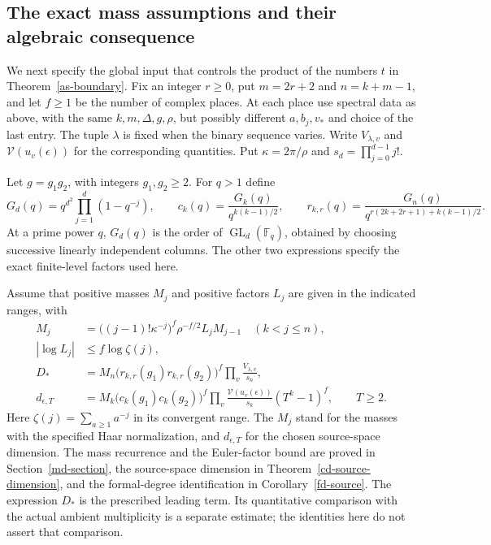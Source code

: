 \subsection{The exact mass assumptions and their algebraic consequence}

We next specify the global input that controls the product of the
numbers $t$ in Theorem~\ref{as-boundary}.  Fix an integer
$r\geq0$, put $m=2r+2$ and $n=k+m-1$, and let $f\geq1$
be the number of complex places.
At each place use spectral data as above, with the same
$k,m,\Delta,g,\rho$, but possibly different $a,b_j,v_*$ and
choice of the last entry.  The tuple $\lambda$ is fixed when
the binary sequence varies.  Write $V_{\lambda,v}$ and
$\mathcal V(u_v(\epsilon))$ for the corresponding quantities.
Put $\kappa=2\pi/\rho$ and
$s_d=\prod_{j=0}^{d-1}j!$.

Let $g=g_1g_2$, with integers $g_1,g_2\geq2$.
For $q>1$ define
\[
 G_d(q)=q^{d^2}\prod_{j=1}^d(1-q^{-j}),\qquad
 c_k(q)=\frac{G_k(q)}{q^{k(k-1)/2}},\qquad
 r_{k,r}(q)=\frac{G_n(q)}
                     {q^{r(2k+2r+1)+k(k-1)/2}}.
\]
At a prime power $q$, $G_d(q)$ is the order of
$\operatorname{GL}_d(\mathbb F_q)$, obtained by choosing
successive linearly independent columns.  The other two
expressions specify the exact finite-level factors used here.

Assume that positive masses $M_j$ and positive factors $L_j$
are given in the indicated ranges, with
\begin{align}
 M_j&=\bigl((j-1)!\kappa^{-j}\bigr)^f
              \rho^{-f/2}L_jM_{j-1}\quad(k<j\leq n),
                  \label{as-mass-assumption}\\
 |\log L_j|&\leq f\log\zeta(j),
                  \label{as-L-assumption}\\
 D_*&=M_n\bigl(r_{k,r}(g_1)r_{k,r}(g_2)\bigr)^f
                        \prod_v\frac{V_{\lambda,v}}{s_n},
                  \label{as-Dstar-assumption}\\
 d_{\epsilon,T}&=M_k\bigl(c_k(g_1)c_k(g_2)\bigr)^f
            \prod_v\frac{\mathcal V(u_v(\epsilon))}{s_k}
                              (T^k-1)^f,\qquad T\geq2.
                  \label{as-column-assumption}
\end{align}
Here $\zeta(j)=\sum_{a\geq1}a^{-j}$ in its convergent range.
The $M_j$ stand for the masses with the specified Haar
normalization, and $d_{\epsilon,T}$ for the chosen source-space
dimension. The mass recurrence and the Euler-factor bound are proved
in Section~\ref{md-section}, the source-space dimension in
Theorem~\ref{cd-source-dimension}, and the formal-degree
identification in Corollary~\ref{fd-source}. The expression $D_*$
is the prescribed leading term. Its quantitative comparison with
the actual ambient multiplicity is a separate estimate; the
identities here do not assert that comparison.

